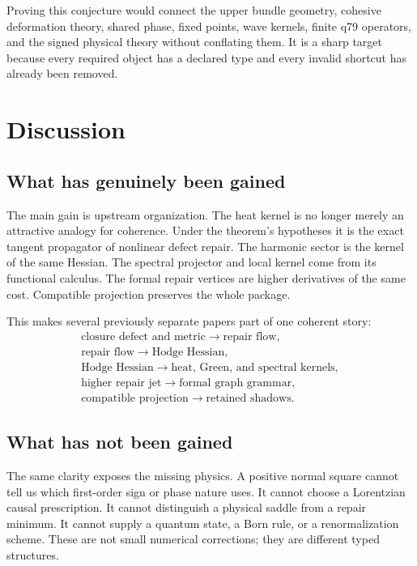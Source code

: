 \documentclass[11pt,a4paper]{article}
\begin{document}
Proving this conjecture would connect the upper bundle geometry, cohesive
deformation theory, shared phase, fixed points, wave kernels, finite q79
operators, and the signed physical theory without conflating them.  It is a
sharp target because every required object has a declared type and every
invalid shortcut has already been removed.

\section{Discussion}

\subsection{What has genuinely been gained}

The main gain is upstream organization.  The heat kernel is no longer merely
an attractive analogy for coherence.  Under the theorem's hypotheses it is
the exact tangent propagator of nonlinear defect repair.  The harmonic sector
is the kernel of the same Hessian.  The spectral projector and local kernel
come from its functional calculus.  The formal repair vertices are higher
derivatives of the same cost.  Compatible projection preserves the whole
package.

This makes several previously separate papers part of one coherent story:
\[
\begin{gathered}
\text{closure defect and metric}
\longrightarrow
\text{repair flow},\\
\text{repair flow}
\longrightarrow
\text{Hodge Hessian},\\
\text{Hodge Hessian}
\longrightarrow
\text{heat, Green, and spectral kernels},\\
\text{higher repair jet}
\longrightarrow
\text{formal graph grammar},\\
\text{compatible projection}
\longrightarrow
\text{retained shadows}.
\end{gathered}
\]

\subsection{What has not been gained}

The same clarity exposes the missing physics.  A positive normal square
cannot tell us which first-order sign or phase nature uses.  It cannot choose
a Lorentzian causal prescription.  It cannot distinguish a physical saddle
from a repair minimum.  It cannot supply a quantum state, a Born rule, or a
renormalization scheme.  These are not small numerical corrections; they are
different typed structures.
\end{document}
